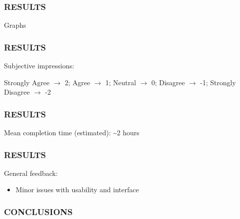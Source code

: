 \documentclass{beamer}
\let\theframetitle\frametitle
\renewcommand\frametitle[1]{\theframetitle{\MakeUppercase{#1}}}
\begin{document}
\begin{frame}
\frametitle{Results}
Graphs
\end{frame}

\begin{frame}
\frametitle{Results}
Subjective impressions:


\begin{center}
  Strongly Agree $\rightarrow$ 2; Agree $\rightarrow$ 1; Neutral $\rightarrow$ 0; Disagree $\rightarrow$ -1; Strongly Disagree $\rightarrow$ -2
\end{center}
\end{frame}

\begin{frame}
\frametitle{Results}

Mean completion time (estimated): \textasciitilde{}2 hours
\end{frame}

\begin{frame}
\frametitle{Results}
General feedback:
\begin{itemize}
\item Minor issues with usability and interface
\end{itemize}
\end{frame}

\begin{frame}
\frametitle{Conclusions}
\end{frame}
\end{document}
